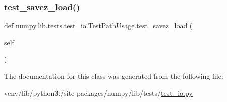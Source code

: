 \mbox{\label{classnumpy_1_1lib_1_1tests_1_1test__io_1_1TestPathUsage_a31494f4107010e2760d77b1283cdfded}} 
\subsubsection{\texorpdfstring{test\+\_\+savez\+\_\+load()}{test\_savez\_load()}}
{\footnotesize\ttfamily def numpy.\+lib.\+tests.\+test\+\_\+io.\+Test\+Path\+Usage.\+test\+\_\+savez\+\_\+load (\begin{DoxyParamCaption}\item[{}]{self }\end{DoxyParamCaption})}



The documentation for this class was generated from the following file\+:\begin{DoxyCompactItemize}
\item 
venv/lib/python3./site-\/packages/numpy/lib/tests/\hyperlink{test__io_8py}{test\+\_\+io.\+py}\end{DoxyCompactItemize}
